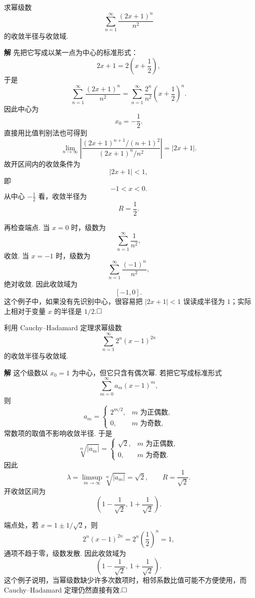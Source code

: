 \documentclass{ctexart}
\newenvironment{custom}[1]{\par\noindent \textbf{#1}\quad}{\par\vspace{1em}}
\begin{document}
\begin{example}
求幂级数
\[
\sum_{n=1}^{\infty}\frac{(2x+1)^n}{n^2}
\]
的收敛半径与收敛域.
\end{example}

\begin{custom}{解}
先把它写成以某一点为中心的标准形式：
\[
2x+1=2\left(x+\frac12\right),
\]
于是
\[
\sum_{n=1}^{\infty}\frac{(2x+1)^n}{n^2}
=
\sum_{n=1}^{\infty}\frac{2^n}{n^2}\left(x+\frac12\right)^n.
\]
因此中心为
\[
x_0=-\frac12.
\]
直接用比值判别法也可得到
\[
\lim_{n\to\infty}
\left|\frac{(2x+1)^{n+1}/(n+1)^2}{(2x+1)^n/n^2}\right|
=|2x+1|.
\]
故开区间内的收敛条件为
\[
|2x+1|<1,
\]
即
\[
-1<x<0.
\]
从中心 $-\frac12$ 看，收敛半径为
\[
R=\frac12.
\]

再检查端点. 当 $x=0$ 时，级数为
\[
\sum_{n=1}^{\infty}\frac{1}{n^2},
\]
收敛. 当 $x=-1$ 时，级数为
\[
\sum_{n=1}^{\infty}\frac{(-1)^n}{n^2},
\]
绝对收敛. 因此收敛域为
\[
[-1,0].
\]
这个例子中，如果没有先识别中心，很容易把 $|2x+1|<1$ 误读成半径为 $1$；实际上相对于变量 $x$ 的半径是 $1/2$.$\hfill{\square}$
\end{custom}

\begin{example}
利用 Cauchy--Hadamard 定理求幂级数
\[
\sum_{n=1}^{\infty}2^n(x-1)^{2n}
\]
的收敛半径与收敛域.
\end{example}

\begin{custom}{解}
这个级数以 $x_0=1$ 为中心，但它只含有偶次幂. 若把它写成标准形式
\[
\sum_{m=0}^{\infty}a_m(x-1)^m,
\]
则
\[
a_m=\begin{cases}
2^{m/2}, & m\text{ 为正偶数},\\
0, & m\text{ 为奇数},
\end{cases}
\]
常数项的取值不影响收敛半径. 于是
\[
\sqrt[m]{|a_m|}
=\begin{cases}
\sqrt{2}, & m\text{ 为正偶数},\\
0, & m\text{ 为奇数}.
\end{cases}
\]
因此
\[
\lambda=\limsup_{m\to\infty}\sqrt[m]{|a_m|}=\sqrt{2},
\qquad
R=\frac{1}{\sqrt{2}}.
\]
开收敛区间为
\[
\left(1-\frac{1}{\sqrt2},\,1+\frac{1}{\sqrt2}\right).
\]

端点处，若 $x=1\pm 1/\sqrt2$，则
\[
2^n(x-1)^{2n}=2^n\left(\frac{1}{2}\right)^n=1,
\]
通项不趋于零，级数发散. 因此收敛域为
\[
\left(1-\frac{1}{\sqrt2},\,1+\frac{1}{\sqrt2}\right).
\]
这个例子说明，当幂级数缺少许多次数项时，相邻系数比值可能不方便使用，而 Cauchy--Hadamard 定理仍然直接有效.$\hfill{\square}$
\end{custom}
\end{document}
